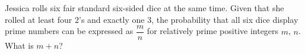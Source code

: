 Jessica rolls six fair standard six-sided dice at the same time. Given that she rolled at least four $2$'s and exactly one $3$, the probability that all six dice display prime numbers can be expressed as $\dfrac{m}{n}$ for relatively prime positive integers $m$, $n$. What is $m + n$?
